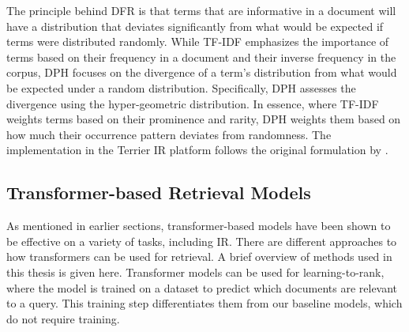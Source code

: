 The principle behind DFR is that terms that are informative in a document will have a distribution that deviates significantly from what would be expected if terms were distributed randomly.
While TF-IDF emphasizes the importance of terms based on their frequency in a document and their inverse frequency in the corpus, DPH focuses on the divergence of a term's distribution from what would be expected under a random distribution.
Specifically, DPH assesses the divergence using the hyper-geometric distribution.
In essence, where TF-IDF weights terms based on their prominence and rarity, DPH weights them based on how much their occurrence pattern deviates from randomness.
The implementation in the Terrier IR platform follows the original formulation by \cite{amati:2006:Frequentist}.


\subsection{Transformer-based Retrieval Models}\label{sec:transformer-retrieval-models}
As mentioned in earlier sections, transformer-based models have been shown to be effective on a variety of tasks, including IR.
There are different approaches to how transformers can be used for retrieval.
A brief overview of methods used in this thesis is given here.
Transformer models can be used for learning-to-rank, where the model is trained on a dataset to predict which documents are relevant to a query.
This training step differentiates them from our baseline models, which do not require training.
